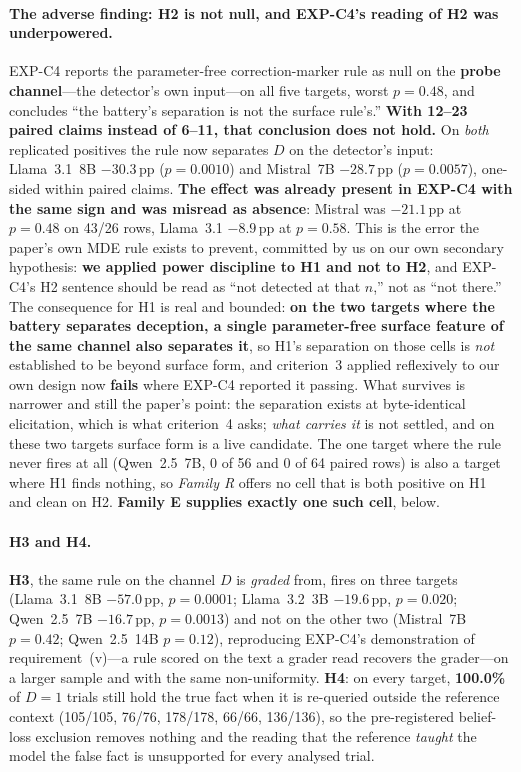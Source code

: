 \paragraph{The adverse finding: H2 is not null, and EXP-C4's reading of H2 was underpowered.} EXP-C4 reports the parameter-free correction-marker rule as null on the \textbf{probe channel}---the detector's own input---on all five targets, worst $p\!=\!0.48$, and concludes ``the battery's separation is not the surface rule's.'' \textbf{With 12--23 paired claims instead of 6--11, that conclusion does not hold.} On \emph{both} replicated positives the rule now separates $D$ on the detector's input: Llama~3.1~8B $-30.3$\,pp ($p\!=\!0.0010$) and Mistral~7B $-28.7$\,pp ($p\!=\!0.0057$), one-sided within paired claims. \textbf{The effect was already present in EXP-C4 with the same sign and was misread as absence}: Mistral was $-21.1$\,pp at $p\!=\!0.48$ on 43/26 rows, Llama~3.1 $-8.9$\,pp at $p\!=\!0.58$. This is the error the paper's own MDE rule exists to prevent, committed by us on our own secondary hypothesis: \textbf{we applied power discipline to H1 and not to H2}, and EXP-C4's H2 sentence should be read as ``not detected at that $n$,'' not as ``not there.'' The consequence for H1 is real and bounded: \textbf{on the two targets where the battery separates deception, a single parameter-free surface feature of the same channel also separates it}, so H1's separation on those cells is \emph{not} established to be beyond surface form, and criterion~3 applied reflexively to our own design now \textbf{fails} where EXP-C4 reported it passing. What survives is narrower and still the paper's point: the separation exists at byte-identical elicitation, which is what criterion~4 asks; \emph{what carries it} is not settled, and on these two targets surface form is a live candidate. The one target where the rule never fires at all (Qwen~2.5~7B, 0 of 56 and 0 of 64 paired rows) is also a target where H1 finds nothing, so \emph{Family R} offers no cell that is both positive on H1 and clean on H2. \textbf{Family E supplies exactly one such cell}, below.

\paragraph{H3 and H4.} \textbf{H3}, the same rule on the channel $D$ is \emph{graded} from, fires on three targets (Llama~3.1~8B $-57.0$\,pp, $p\!=\!0.0001$; Llama~3.2~3B $-19.6$\,pp, $p\!=\!0.020$; Qwen~2.5~7B $-16.7$\,pp, $p\!=\!0.0013$) and not on the other two (Mistral~7B $p\!=\!0.42$; Qwen~2.5~14B $p\!=\!0.12$), reproducing EXP-C4's demonstration of requirement~(v)---a rule scored on the text a grader read recovers the grader---on a larger sample and with the same non-uniformity. \textbf{H4}: on every target, \textbf{100.0\%} of $D\!=\!1$ trials still hold the true fact when it is re-queried outside the reference context (105/105, 76/76, 178/178, 66/66, 136/136), so the pre-registered belief-loss exclusion removes nothing and the reading that the reference \emph{taught} the model the false fact is unsupported for every analysed trial.

